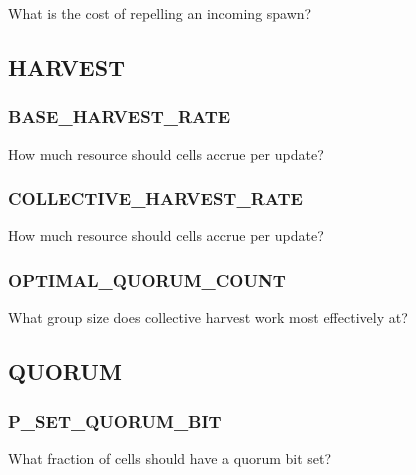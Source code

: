What is the cost of repelling an incoming spawn?


\subsection{HARVEST}


\subsubsection{BASE\_HARVEST\_RATE}


How much resource should cells accrue per update?

\subsubsection{COLLECTIVE\_HARVEST\_RATE}


How much resource should cells accrue per update?

\subsubsection{OPTIMAL\_QUORUM\_COUNT}


What group size does collective harvest work most effectively at?


\subsection{QUORUM}


\subsubsection{P\_SET\_QUORUM\_BIT}


What fraction of cells should have a quorum bit set?



